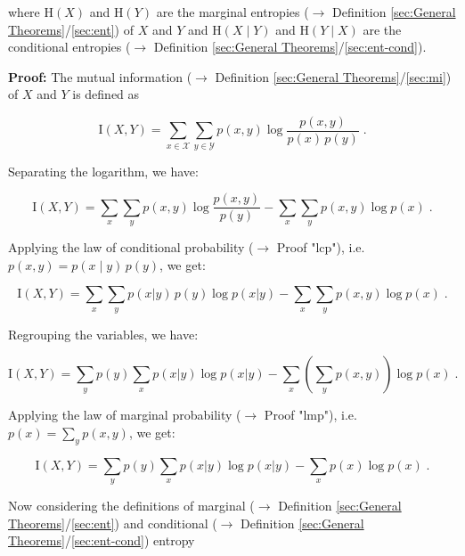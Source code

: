 \documentclass[a4paper,12pt]{book}
\begin{document}
where $\mathrm{H}(X)$ and $\mathrm{H}(Y)$ are the marginal entropies ($\rightarrow$ Definition \ref{sec:General Theorems}/\ref{sec:ent}) of $X$ and $Y$ and $\mathrm{H}(X \mid Y)$ and $\mathrm{H}(Y \mid X)$ are the conditional entropies ($\rightarrow$ Definition \ref{sec:General Theorems}/\ref{sec:ent-cond}).


\vspace{1em}
\textbf{Proof:} The mutual information ($\rightarrow$ Definition \ref{sec:General Theorems}/\ref{sec:mi}) of $X$ and $Y$ is defined as

\begin{equation} \label{eq:dmi-mce-MI}
\mathrm{I}(X,Y) = \sum_{x \in \mathcal{X}} \sum_{y \in \mathcal{Y}} p(x,y) \log \frac{p(x,y)}{p(x)\,p(y)} \; .
\end{equation}

Separating the logarithm, we have:

\begin{equation} \label{eq:dmi-mce-MI-s1}
\mathrm{I}(X,Y) = \sum_x \sum_y p(x,y) \log \frac{p(x,y)}{p(y)} - \sum_x \sum_y p(x,y) \log p(x) \; .
\end{equation}

Applying the law of conditional probability ($\rightarrow$ Proof "lcp"), i.e. $p(x,y) = p(x \mid y) \, p(y)$, we get:

\begin{equation} \label{eq:dmi-mce-MI-s2}
\mathrm{I}(X,Y) = \sum_x \sum_y p(x|y) \, p(y) \log p(x|y) - \sum_x \sum_y p(x,y) \log p(x) \; .
\end{equation}

Regrouping the variables, we have:

\begin{equation} \label{eq:dmi-mce-MI-s3}
\mathrm{I}(X,Y) = \sum_y p(y) \sum_x p(x|y) \log p(x|y) - \sum_x \left( \sum_y p(x,y) \right) \log p(x) \; .
\end{equation}

Applying the law of marginal probability ($\rightarrow$ Proof "lmp"), i.e. $p(x) = \sum_y p(x,y)$, we get:

\begin{equation} \label{eq:dmi-mce-MI-s4}
\mathrm{I}(X,Y) = \sum_y p(y) \sum_x p(x|y) \log p(x|y) - \sum_x p(x) \log p(x) \; .
\end{equation}

Now considering the definitions of marginal ($\rightarrow$ Definition \ref{sec:General Theorems}/\ref{sec:ent}) and conditional ($\rightarrow$ Definition \ref{sec:General Theorems}/\ref{sec:ent-cond}) entropy
\end{document}
